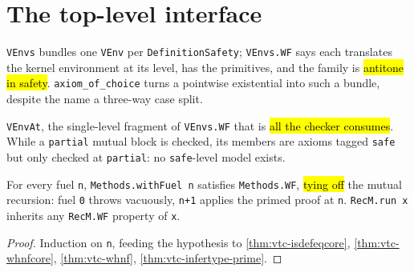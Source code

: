 \section{The top-level interface}

\begin{definition}
  \label{def:vtc-venvs}
  \leanok

   \texttt{VEnvs} bundles one \texttt{VEnv} per \texttt{DefinitionSafety};
  \texttt{VEnvs.WF} says each translates the kernel environment at its level, has the
  primitives, and the family is \hl{antitone in safety}. \texttt{axiom\_of\_choice} turns a
  pointwise existential into such a bundle, despite the name a three-way case split.
\end{definition}

\begin{definition}
  \label{def:vtc-venvat}
  \leanok

   \texttt{VEnvAt}, the single-level fragment of \texttt{VEnvs.WF} that is
  \hl{all the checker consumes}.
   While a \texttt{partial} mutual block is checked, its members are axioms tagged
  \texttt{safe} but only checked at \texttt{partial}: no \texttt{safe}-level model exists.
\end{definition}

\begin{theorem}
  \label{thm:vtc-withfuel}
  \leanok

   For every fuel \texttt{n}, \texttt{Methods.withFuel n} satisfies
  \texttt{Methods.WF}, \hl{tying off} the mutual recursion: fuel \texttt{0} throws vacuously,
  \texttt{n+1} applies the primed proof at \texttt{n}. \texttt{RecM.run x} inherits any
  \texttt{RecM.WF} property of \texttt{x}.
\end{theorem}
\begin{proof}
  \leanok
   Induction on \texttt{n}, feeding the hypothesis to
  \ref{thm:vtc-isdefeqcore}, \ref{thm:vtc-whnfcore}, \ref{thm:vtc-whnf},
  \ref{thm:vtc-infertype-prime}.
\end{proof}

